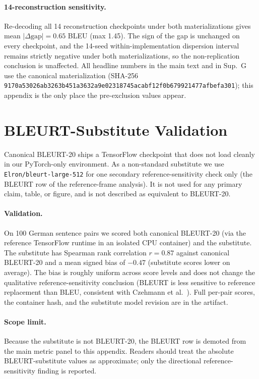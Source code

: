 \documentclass[pdflatex,sn-chicago]{sn-jnl}
\begin{document}
\paragraph{14-reconstruction sensitivity.} Re-decoding all 14 reconstruction checkpoints under both materializations gives mean $|\Delta\text{gap}| = 0.65$ BLEU (max 1.45). The sign of the gap is unchanged on every checkpoint, and the 14-seed within-implementation dispersion interval remains strictly negative under both materializations, so the non-replication conclusion is unaffected. All headline numbers in the main text and in Sup.~G use the canonical materialization (SHA-256 \texttt{9170a53026ab3263b451a3632a9e02318745acabf12f0b679921477afbefa301}); this appendix is the only place the pre-exclusion values appear.

\section{BLEURT-Substitute Validation}
\label{sec:appendix_bleurt}
Canonical BLEURT-20 ships a TensorFlow checkpoint that does not load cleanly in our PyTorch-only environment. As a non-standard substitute we use \texttt{Elron/bleurt-large-512} for one secondary reference-sensitivity check only (the BLEURT row of the reference-frame analysis). It is not used for any primary claim, table, or figure, and is not described as equivalent to BLEURT-20.

\paragraph{Validation.} On 100 German sentence pairs we scored both canonical BLEURT-20 (via the reference TensorFlow runtime in an isolated CPU container) and the substitute. The substitute has Spearman rank correlation $r = 0.87$ against canonical BLEURT-20 and a mean signed bias of $-0.47$ (substitute scores lower on average). The bias is roughly uniform across score levels and does not change the qualitative reference-sensitivity conclusion (BLEURT is less sensitive to reference replacement than BLEU, consistent with Czehmann et al.~\cite{czehmann2026sacred}). Full per-pair scores, the container hash, and the substitute model revision are in the artifact.

\paragraph{Scope limit.} Because the substitute is not BLEURT-20, the BLEURT row is demoted from the main metric panel to this appendix. Readers should treat the absolute BLEURT-substitute values as approximate; only the directional reference-sensitivity finding is reported.
\end{document}
